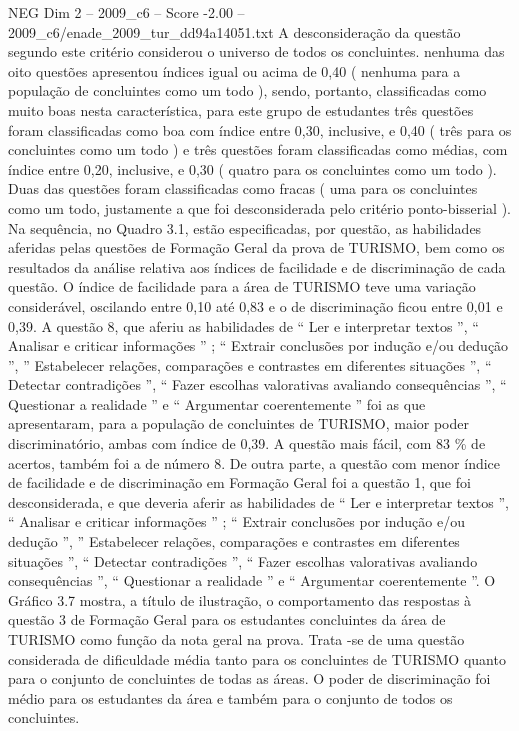 \begin{textsample}{NEG Dim 2 – 2009\_c6 – Score -2.00 – 2009\_c6/enade\_2009\_tur\_dd94a14051.txt}
A desconsideração da questão segundo este critério considerou o universo de todos os concluintes. nenhuma das oito questões apresentou índices igual ou acima de 0,40 ( nenhuma para a população de concluintes como um todo ), sendo, portanto, classificadas como muito boas nesta característica, para este grupo de estudantes três questões foram classificadas como boa com índice entre 0,30, inclusive, e 0,40 ( três para os concluintes como um todo ) e três questões foram classificadas como médias, com índice entre 0,20, inclusive, e 0,30 ( quatro para os concluintes como um todo ).
Duas das questões foram classificadas como fracas ( uma para os concluintes como um todo, justamente a que foi desconsiderada pelo critério ponto-bisserial ).
Na sequência, no Quadro 3.1, estão especificadas, por questão, as habilidades aferidas pelas questões de Formação Geral da prova de TURISMO, bem como os resultados da análise relativa aos índices de facilidade e de discriminação de cada questão.
O índice de facilidade para a área de TURISMO teve uma variação considerável, oscilando entre 0,10 até 0,83 e o de discriminação ficou entre 0,01 e 0,39.
A questão 8, que aferiu as habilidades de “ Ler e interpretar textos ”, “ Analisar e criticar informações ” ; “ Extrair conclusões por indução e/ou dedução ”, ” Estabelecer relações, comparações e contrastes em diferentes situações ”, “ Detectar contradições ”, “ Fazer escolhas valorativas avaliando consequências ”, “ Questionar a realidade ” e “ Argumentar coerentemente ” foi as que apresentaram, para a população de concluintes de TURISMO, maior poder discriminatório, ambas com índice de 0,39.
A questão mais fácil, com 83 \% de acertos, também foi a de número 8.
De outra parte, a questão com menor índice de facilidade e de discriminação em Formação Geral foi a questão 1, que foi desconsiderada, e que deveria aferir as habilidades de “ Ler e interpretar textos ”, “ Analisar e criticar informações ” ; “ Extrair conclusões por indução e/ou dedução ”, ” Estabelecer relações, comparações e contrastes em diferentes situações ”, “ Detectar contradições ”, “ Fazer escolhas valorativas avaliando consequências ”, “ Questionar a realidade ” e “ Argumentar coerentemente ”.
O Gráfico 3.7 mostra, a título de ilustração, o comportamento das respostas à questão 3 de Formação Geral para os estudantes concluintes da área de TURISMO como função da nota geral na prova.
Trata -se de uma questão considerada de dificuldade média tanto para os concluintes de TURISMO quanto para o conjunto de concluintes de todas as áreas.
O poder de discriminação foi médio para os estudantes da área e também para o conjunto de todos os concluintes.

\end{textsample}
